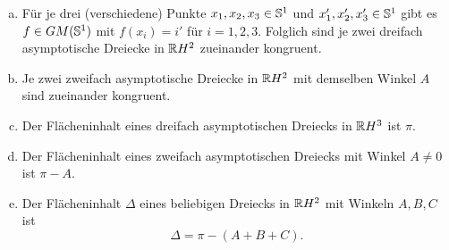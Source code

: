 \begin{thm}
  \begin{enumerate}[a)]
  \item Für je drei (verschiedene) Punkte $x_1, x_2, x_3 \in \mathbb{S}^1$ und
    $x_1', x_2', x_3' \in \mathbb{S}^1$ gibt es $f \in GM(\mathbb{S}^1)$ mit $f(x_i) =
    i'$ für $i = 1,2,3$.
    Folglich sind je zwei dreifach asymptotische Dreiecke in $\mathbb{R} H^2$
    zueinander kongruent.
    \item Je zwei zweifach asymptotische Dreiecke in $\mathbb{R} H^2$ mit demselben
      Winkel $A$ sind zueinander kongruent.
    \item Der Flächeninhalt eines dreifach asymptotischen Dreiecks in $\mathbb{R}
      H^3$ ist $\pi$.
    \item Der Flächeninhalt eines zweifach asymptotischen Dreiecks mit Winkel $A
      \ne 0$ ist $\pi - A$.
    \item Der Flächeninhalt $\Delta$ eines beliebigen Dreiecks in $\mathbb{R} H^2$
      mit Winkeln $A,B,C$ ist
      \[ \Delta = \pi - (A+B+C). \]
  \end{enumerate}
\end{thm}
